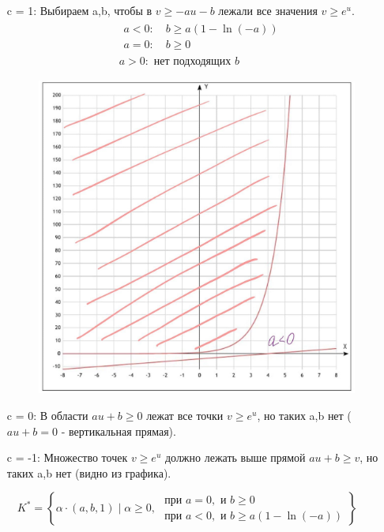 \documentclass[12pt,letterpaper]{article}
\begin{document}
\begin{itemize}
	\item[c = 1: ] Выбираем a,b, чтобы в $ v \geq -au - b $ лежали все значения $v \geq e^{u}$.
	$$
\begin{aligned}
&\begin{array}{l}
a<0: \quad b \geq a(1-\ln (-a)) \\
a=0: \quad b \geq 0
\end{array}\\
&a>0: \text { нет подходящих } b
\end{aligned}
$$
\begin{figure}[h!]
\begin{minipage}[h]{1\linewidth}
\begin{center}
\includegraphics[width=0.6\linewidth]{cone}
\end{center}
\end{minipage}
\end{figure}
	
	\item[c = 0: ] В области $ au+b \geq 0 $ лежат все точки $v \geq e^{u}$, но таких a,b нет ($ au+b = 0 $ - вертикальная прямая).
	\item[c = -1: ] Множество точек  $v \geq e^{u}$ должно лежать выше прямой $ au+b \geq v $, но таких a,b нет (видно из графика).
\end{itemize}

$$
K^{*}=\left\{ \alpha \cdot (a, b, 1) \mid \alpha \geq 0, \begin{array}{l}
\text { при } a=0, \text { и } b \geq 0 \\
\text { при } a<0, \text { и } b \geq a(1-\ln (-a))
\end{array}\right\}
$$
\end{document}
